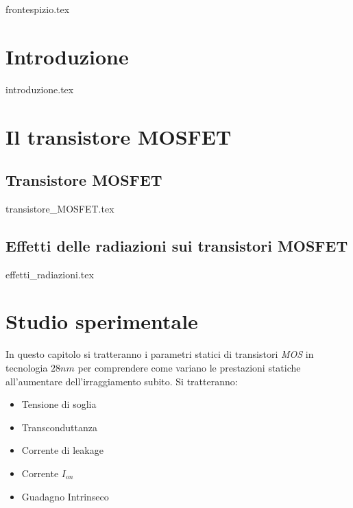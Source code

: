 \documentclass[
	a4paper,
	cleardoublepage=empty,
	headings=twolinechapter,
	numbers=autoenddot,
]{scrbook}
\begin{document}
\frontmatter

{frontespizio.tex}

\tableofcontents
\listoffigures

\listoftables 
\mainmatter

\chapter*{Introduzione}
{introduzione.tex}



\chapter{Il transistore MOSFET}
\section{Transistore MOSFET}
{transistore_MOSFET.tex}

\section{Effetti delle radiazioni sui transistori MOSFET}
{effetti_radiazioni.tex}


\chapter{Studio sperimentale}
In questo capitolo si tratteranno i parametri statici di transistori \emph{MOS} in tecnologia $28 nm$ per comprendere come variano le prestazioni statiche all'aumentare dell'irraggiamento subito. Si tratteranno:
\begin{itemize}
  \item Tensione di soglia
  \item Transconduttanza
  \item Corrente di leakage
  \item Corrente $I_{on}$
  \item Guadagno Intrinseco
\end{itemize}
\end{document}
